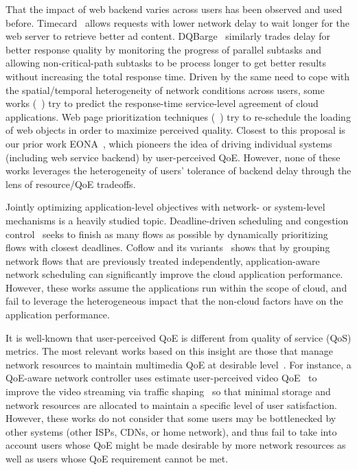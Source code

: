That the impact of web backend varies across users has been observed and used before. 
Timecard~\cite{timecard} allows requests with lower network delay to wait longer for the web server to retrieve better ad content. 
DQBarge~\cite{dqbarge} similarly trades delay for better response quality by monitoring the progress of parallel subtasks and allowing non-critical-path subtasks to be process longer to get better results without increasing the total response time.
Driven by the same need to cope with the spatial/temporal heterogeneity of network conditions across users, some works (\eg~\cite{jayathilaka2015response}) try to predict the response-time service-level agreement of cloud applications.
Web page prioritization techniques (\eg~\cite{butkiewicz2015klotski,netravali2016polaris}) try to re-schedule the loading of web objects in order to maximize perceived quality.
Closest to this proposal is our prior work EONA~\cite{eona}, which pioneers the idea of driving individual systems (including web service backend) by user-perceived QoE.
However, none of these works leverages the heterogeneity of users' tolerance of backend delay through the lens of resource/QoE tradeoffs. 

Jointly optimizing application-level objectives with network- or system-level mechanisms is a heavily studied topic. 
Deadline-driven scheduling and congestion control~\cite{vamanan2012deadline,wilson2011better} seeks to finish as many flows as possible by dynamically prioritizing flows with closest deadlines.
Coflow and its variants~\cite{coflow,chowdhury2015efficient} shows that by grouping network flows that are previously treated independently, application-aware network scheduling can significantly improve the cloud application performance.
However, these works assume the applications run within the scope of cloud, and fail to leverage the heterogeneous impact that the non-cloud factors have on the application performance.

It is well-known that user-perceived QoE is different from quality of service (QoS) metrics. 
The most relevant works based on this insight are those that manage network resources to maintain multimedia QoE at desirable level~\cite{barakovic2013survey,hobfeld2012challenges,seufert2015survey,joseph2014nova}. 
For instance, a QoE-aware network controller uses estimate user-perceived video QoE~\cite{huysegems2012session} to improve the video streaming via traffic shaping~\cite{petrangeli2015network} so that minimal storage and network resources are allocated to maintain a specific level of user satisfaction.
However, these works do not consider that some users may be bottlenecked by other systems (other ISPs, CDNs, or home network), and thus fail to take into account users whose QoE might be made desirable by more network resources as well as users whose QoE requirement cannot be met.




